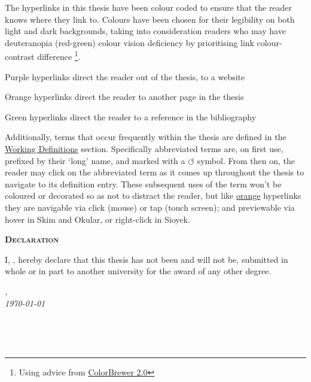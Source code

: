 \begin{SingleSpace}
\noindent The hyperlinks in this thesis have been colour coded to ensure that the reader knows where they link to. Colours have been chosen for their legibility on both light and dark backgrounds, taking into consideration readers who may have deuteranopia (red-green) colour vision deficiency by prioritising link colour-contrast difference \footnote{Using advice from \href{https://colorbrewer2.org/\#type=qualitative\&scheme=Dark2}{ColorBrewer 2.0}}.

\vspace*{0.25cm}
\noindent\textcolor{Hyurlcolor}{Purple} hyperlinks direct the reader out of the thesis, to a website

\noindent\textcolor{Hylinkcolor}{Orange} hyperlinks direct the reader to another page in the thesis

\noindent\textcolor{Hycitecolor}{Green} hyperlinks direct the reader to a reference in the bibliography

\vspace*{0.25cm}
\noindent Additionally, terms that occur frequently within the thesis are defined in the \hyperref[main]{Working Definitions} section. Specifically abbreviated terms are, on first use, prefixed by their `long' name, and marked with a \textcolor{Hylinkcolor}{$\circlearrowleft$} symbol. From then on, the reader may click on the abbreviated term as it comes up throughout the thesis to navigate to its definition entry. These subsequent uses of the term won't be coloured or decorated so as not to distract the reader, but like \hyperref[sec: reading]{orange} hyperlinks they are navigable via click (mouse) or tap (touch screen); and previewable via hover in Skim and Okular, or right-click in Sioyek.

\begin{flushleft}
{}
 \begin{flushleft}
	\Huge \textsc{\textbf{Declaration}}
\end{flushleft}

\begin{flushleft}
	\noindent I, \myName, hereby declare that this thesis has not been and will not be, submitted in whole or in part to another university for the award of any other degree.
\end{flushleft}

\begin{minipage}{.45\linewidth}
	\begin{flushleft} %
		\textit{\myLocation,} \\
		\textit{\today}%
	\end{flushleft}
\end{minipage}
\hfill
\begin{minipage}{.45\linewidth}
	\begin{flushright} %
		\makebox[2.5in]{\hrulefill} \\
		\myName 
	\end{flushright}
\end{minipage}\\
\end{flushleft}
\end{SingleSpace}%